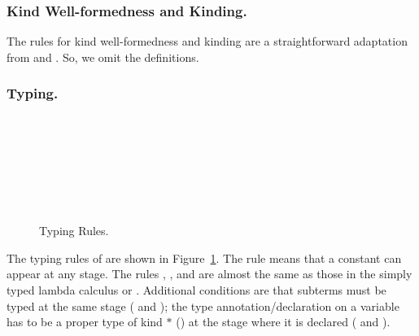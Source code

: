 \subsubsection{Kind Well-formedness and Kinding.}

The rules for kind well-formedness and kinding are a straightforward adaptation
from \LLF and \LTP. So, we omit the definitions.

\subsubsection{Typing.}
\label{sec:typing}

\begin{figure}[tbp]
  \begin{center}
     \hfil
     \\[2mm]
     \\[2mm]
     \\[2mm]
     \\[2mm]
     \andalso
     \\[2mm]
     \\[2mm]
     \andalso
    \caption{Typing Rules.}
    \label{fig:typing-rules}
  \end{center}
\end{figure}

The typing rules of \LMD are shown in Figure~\ref{fig:typing-rules}.
The rule \TConst{} means that a constant can appear at any stage.
The rules \TVar, \TAbs, and \TApp{} are almost the same as those in the simply typed
lambda calculus or \LLF.  Additional conditions are that subterms must be
typed at the same stage (\TAbs{} and \TApp); the type
annotation/declaration on a variable has to be a proper type of kind
$*$ (\TAbs) at the stage where it is declared (\TVar{} and \TAbs).

